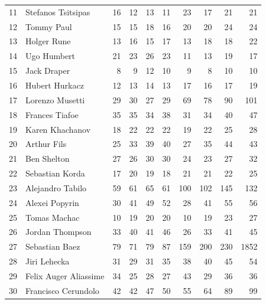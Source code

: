 \begin{table}[ht!]
\begin{tabular}{rlrrrrrrrr}
    11 & Stefanos Tsitsipas & 16 & 12 & 13 & 11 & 23 & 17 & 21 & 21 \\
    12 & Tommy Paul & 15 & 15 & 18 & 16 & 20 & 20 & 24 & 24 \\
    13 & Holger Rune & 13 & 16 & 15 & 17 & 13 & 18 & 18 & 22 \\
    14 & Ugo Humbert & 21 & 23 & 26 & 23 & 11 & 13 & 19 & 17 \\
    15 & Jack Draper & 8 & 9 & 12 & 10 & 9 & 8 & 10 & 10 \\
    16 & Hubert Hurkacz & 12 & 13 & 14 & 13 & 17 & 16 & 17 & 19 \\
    17 & Lorenzo Musetti & 29 & 30 & 27 & 29 & 69 & 78 & 90 & 101 \\
    18 & Frances Tiafoe & 35 & 35 & 34 & 38 & 31 & 34 & 40 & 47 \\
    19 & Karen Khachanov & 18 & 22 & 22 & 22 & 19 & 22 & 25 & 28 \\
    20 & Arthur Fils & 25 & 33 & 39 & 40 & 27 & 35 & 44 & 43 \\
    21 & Ben Shelton & 27 & 26 & 30 & 30 & 24 & 23 & 27 & 32 \\
    22 & Sebastian Korda & 17 & 20 & 19 & 18 & 21 & 21 & 22 & 25 \\
    23 & Alejandro Tabilo & 59 & 61 & 65 & 61 & 100 & 102 & 145 & 132 \\
    24 & Alexei Popyrin & 30 & 41 & 49 & 52 & 28 & 41 & 55 & 56 \\
    25 & Tomas Machac & 10 & 19 & 20 & 20 & 10 & 19 & 23 & 27 \\
    26 & Jordan Thompson & 33 & 40 & 41 & 46 & 26 & 33 & 41 & 45 \\
    27 & Sebastian Baez & 79 & 71 & 79 & 87 & 159 & 200 & 230 & 1852 \\
    28 & Jiri Lehecka & 31 & 29 & 31 & 35 & 38 & 40 & 45 & 54 \\
    29 & Felix Auger Aliassime & 34 & 25 & 28 & 27 & 43 & 29 & 36 & 36 \\
    30 & Francisco Cerundolo & 42 & 42 & 47 & 50 & 55 & 64 & 89 & 99 \\
    \bottomrule
  \end{tabular}
  \label{tab:ranking-comparison-overall-and-hard}
\end{table}

